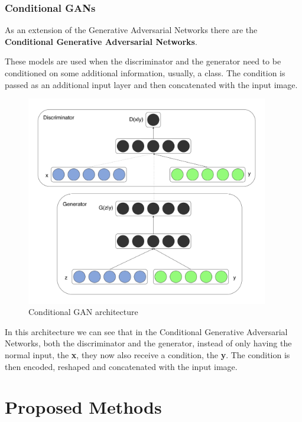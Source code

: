 \documentclass[12pt,a4paper,oneside]{memoir}
\begin{document}
\subsection{Conditional GANs}

As an extension of the Generative Adversarial Networks there are the \textbf{Conditional Generative Adversarial Networks}. 

\par These models are used when the discriminator and the generator need to be conditioned on some additional information, usually, a class. The condition is passed as an additional input layer and then concatenated with the input image.



\begin{figure}[!thb]
\centering
\includegraphics[width=300pt]{images/cGANs.png}
\caption{Conditional GAN architecture}
\centering
\end{figure}



In this architecture  we can see that in the Conditional Generative Adversarial Networks, both the discriminator and the generator, instead of only having the normal input, the \textbf{x}, they now also receive a condition, the \textbf{y}. The condition is then encoded, reshaped and concatenated with the input image.




\clearpage{\thispagestyle{empty}\cleardoublepage}


\chapter{Proposed Methods}
\label{chap:cganimp}
\end{document}
